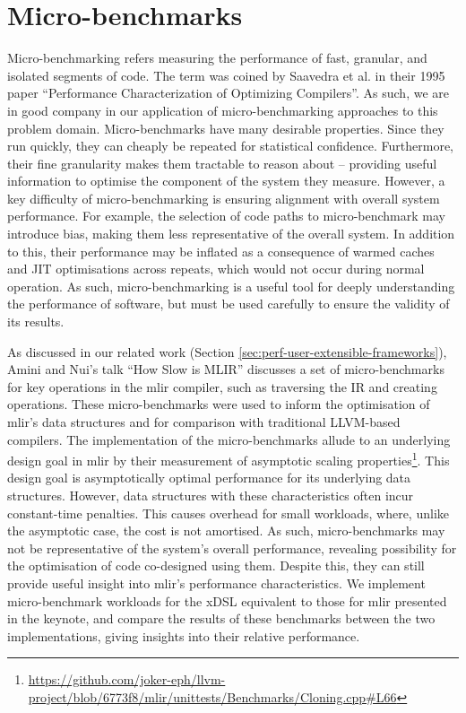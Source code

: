 \section{Micro-benchmarks}
\label{sec:ubenchmark}

Micro-benchmarking refers measuring the performance of fast, granular, and isolated segments of code.
The term was coined by Saavedra et al. in their 1995 paper \cite{saavedraPerformanceCharacterizationOptimizing1995} ``Performance Characterization of Optimizing Compilers''. As such, we are in good company in our application of micro-benchmarking approaches to this problem domain.
Micro-benchmarks have many desirable properties. Since they run quickly, they can cheaply be repeated for statistical confidence.
Furthermore, their fine granularity makes them tractable to reason about -- providing useful information to optimise the component of the system they measure.
However, a key difficulty of micro-benchmarking is ensuring alignment with overall system performance. For example, the selection of code paths to micro-benchmark may introduce bias, making them less representative of the overall system. In addition to this, their performance may be inflated as a consequence of warmed caches and JIT optimisations across repeats, which would not occur during normal operation.
As such, micro-benchmarking is a useful tool for deeply understanding the performance of software, but must be used carefully to ensure the validity of its results.

As discussed in our related work (Section \ref{sec:perf-user-extensible-frameworks}), Amini and Nui's talk ``How Slow is MLIR'' \cite{aminiHowSlowMLIR2024} discusses a set of micro-benchmarks for key operations in the \ac{mlir} compiler, such as traversing the IR and creating operations.
These micro-benchmarks were used to inform the optimisation of \ac{mlir}'s data structures and for comparison with traditional LLVM-based compilers. The implementation of the micro-benchmarks allude to an underlying design goal in \ac{mlir} by their measurement of asymptotic scaling properties\footnote{\scriptsize{\url{https://github.com/joker-eph/llvm-project/blob/6773f8/mlir/unittests/Benchmarks/Cloning.cpp\#L66}}}. This design goal is asymptotically optimal performance for its underlying data structures. However, data structures with these characteristics often incur constant-time penalties.
This causes overhead for small workloads, where, unlike the asymptotic case, the cost is not amortised. As such, micro-benchmarks may not be representative of the system's overall performance, revealing possibility for the optimisation of code co-designed using them.
Despite this, they can still provide useful insight into \ac{mlir}'s performance characteristics.
We implement micro-benchmark workloads for the xDSL equivalent to those for \ac{mlir} presented in the keynote, and compare the results of these benchmarks between the two implementations, giving insights into their relative performance.

